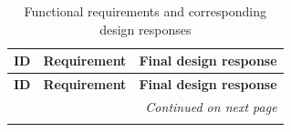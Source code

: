 \begin{longtable}{|p{}|p{}|p{}|}
	\caption{Functional requirements and corresponding design responses}
	\label{tab:functional-requirements-long}                                                                                                                                                                                                                                    \\
	\hline
	\textbf{ID} & \textbf{Requirement}                                                                            & \textbf{Final design response}                                                                                                                              \\
	\hline
	\endfirsthead
	\hline
	\textbf{ID} & \textbf{Requirement}                                                                            & \textbf{Final design response}                                                                                                                              \\
	\hline
	\endhead
	\hline
	\multicolumn{3}{|r|}{\emph{Continued on next page}}                                                                                                                                                                                                                         \\
	\hline
	\endfoot
	\hline
	\endlastfoot


\end{longtable}
